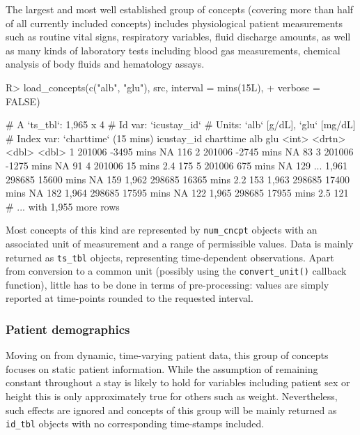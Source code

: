 \documentclass[
  notitle]{jss}
\begin{document}
The largest and most well established group of concepts (covering more
than half of all currently included concepts) includes physiological
patient measurements such as routine vital signs, respiratory variables,
fluid discharge amounts, as well as many kinds of laboratory tests
including blood gas measurements, chemical analysis of body fluids and
hematology assays.

\begin{CodeChunk}
\begin{CodeInput}
R> load_concepts(c("alb", "glu"), src, interval = mins(15L),
+               verbose = FALSE)
\end{CodeInput}
\begin{CodeOutput}
# A `ts_tbl`: 1,965 x 4
# Id var:     `icustay_id`
# Units:      `alb` [g/dL], `glu` [mg/dL]
# Index var:  `charttime` (15 mins)
      icustay_id charttime    alb   glu
           <int> <drtn>     <dbl> <dbl>
    1     201006 -3495 mins  NA     116
    2     201006 -2745 mins  NA      83
    3     201006 -1275 mins  NA      91
    4     201006    15 mins   2.4   175
    5     201006   675 mins  NA     129
  ...
1,961     298685 15600 mins  NA     159
1,962     298685 16365 mins   2.2   153
1,963     298685 17400 mins  NA     182
1,964     298685 17595 mins  NA     122
1,965     298685 17955 mins   2.5   121
# ... with 1,955 more rows
\end{CodeOutput}
\end{CodeChunk}

Most concepts of this kind are represented by \texttt{num\_cncpt}
objects with an associated unit of measurement and a range of
permissible values. Data is mainly returned as \texttt{ts\_tbl} objects,
representing time-dependent observations. Apart from conversion to a
common unit (possibly using the \texttt{convert\_unit()} callback
function), little has to be done in terms of pre-processing: values are
simply reported at time-points rounded to the requested interval.

\hypertarget{patient-demographics}{%
\subsubsection{Patient demographics}\label{patient-demographics}}

Moving on from dynamic, time-varying patient data, this group of
concepts focuses on static patient information. While the assumption of
remaining constant throughout a stay is likely to hold for variables
including patient sex or height this is only approximately true for
others such as weight. Nevertheless, such effects are ignored and
concepts of this group will be mainly returned as \texttt{id\_tbl}
objects with no corresponding time-stamps included.
\end{document}
